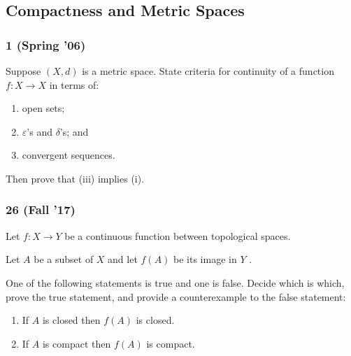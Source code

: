 \hypertarget{compactness-and-metric-spaces}{%
\subsection{Compactness and Metric
Spaces}\label{compactness-and-metric-spaces}}

\hypertarget{spring-06}{%
\subsubsection{1 (Spring '06)}\label{spring-06}}

\begin{problem}[?]

Suppose \((X, d)\) is a metric space. State criteria for continuity of a
function \(f : X \to X\) in terms of:

\begin{enumerate}
\def\labelenumi{\roman{enumi}.}
\item
  open sets;
\item
  \({\varepsilon}\)'s and \(\delta\)'s; and
\item
  convergent sequences.
\end{enumerate}

Then prove that (iii) implies (i).

\end{problem}

\hypertarget{fall-17}{%
\subsubsection{26 (Fall '17)}\label{fall-17}}

\begin{problem}[?]

Let \(f : X \to Y\) be a continuous function between topological spaces.

Let \(A\) be a subset of \(X\) and let \(f (A)\) be its image in \(Y\) .

One of the following statements is true and one is false. Decide which
is which, prove the true statement, and provide a counterexample to the
false statement:

\begin{enumerate}
\def\labelenumi{\arabic{enumi}.}
\item
  If \(A\) is closed then \(f (A)\) is closed.
\item
  If \(A\) is compact then \(f (A)\) is compact.
\end{enumerate}

\end{problem}

